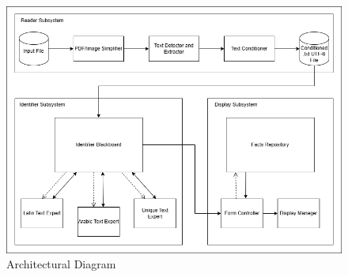 \begin{figure}[H]
	\centering
	\includegraphics[width=\linewidth]{Section3/architectural_diagramV2.png}
	\caption{Architectural Diagram}
	\label{Architectural    Diagram}
\end{figure}

